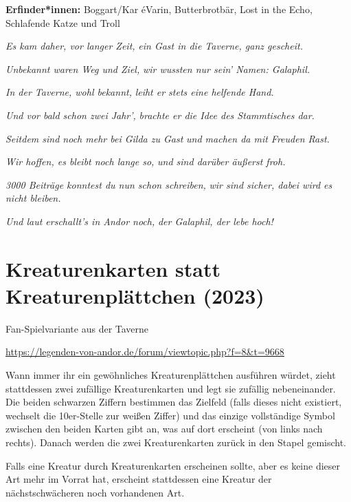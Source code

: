{

\textbf{Erfinder*innen:} Boggart/Kar éVarin, Butterbrotbär,
Lost in the Echo, Schlafende Katze und Troll\bigskip

\textit{Es kam daher, vor langer Zeit,} \textit{ein Gast in die Taverne, ganz gescheit.}

\textit{Unbekannt waren Weg und Ziel,} \textit{wir wussten nur sein' Namen: Galaphil.}

\textit{In der Taverne, wohl bekannt,} \textit{leiht er stets eine helfende Hand.}

\textit{Und vor bald schon zwei Jahr',} \textit{brachte er die Idee des Stammtisches dar.}

\textit{Seitdem sind noch mehr bei Gilda zu Gast} \textit{und machen da mit Freuden Rast.}

\textit{Wir hoffen, es bleibt noch lange so,} \textit{und sind darüber äußerst froh.}

\textit{3000 Beiträge konntest du nun schon schreiben,} \textit{wir sind sicher, dabei wird es nicht bleiben.}

\textit{Und laut erschallt's in Andor noch,} \textit{der Galaphil, der lebe hoch!}








\newpage
\section{Kreaturenkarten statt Kreaturenplättchen (2023)}

\begin{center}
    Fan-Spielvariante aus der Taverne

    \url{https://legenden-von-andor.de/forum/viewtopic.php?f=8&t=9668}
\end{center}

 

Wann immer ihr ein gewöhnliches Kreaturenplättchen ausführen würdet, zieht stattdessen zwei zufällige Kreaturenkarten und legt sie zufällig nebeneinander. Die beiden schwarzen Ziffern bestimmen das Zielfeld (falls dieses nicht existiert, wechselt die 10er-Stelle zur weißen Ziffer) und das einzige vollständige Symbol zwischen den beiden Karten gibt an, was auf dort erscheint (von links nach rechts). Danach werden die zwei Kreaturenkarten zurück in den Stapel gemischt.

Falls eine Kreatur durch Kreaturenkarten erscheinen sollte, aber es keine dieser Art mehr im Vorrat hat, erscheint stattdessen eine Kreatur der nächstschwächeren noch vorhandenen Art.

}
